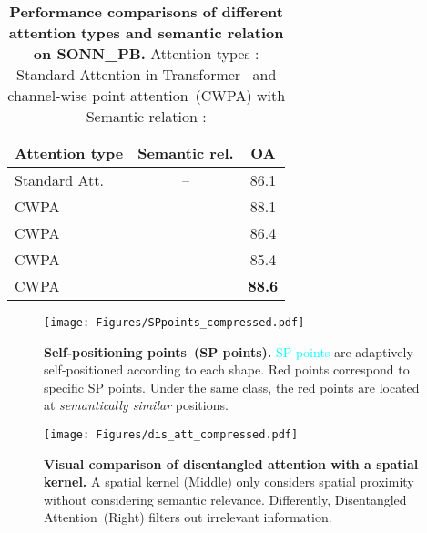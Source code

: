 \documentclass[10pt,twocolumn,letterpaper]{article}
\begin{document}
\begin{table}[t]
  \centering
\setlength{\tabcolsep}{5pt}
\begin{tabular}{l|c|c}
    \toprule
    Attention type& Semantic rel.  &   OA\\
    \midrule
    Standard Att.  &-- & 86.1\\
    CWPA &    & 88.1\\
    CWPA &     & 86.4\\
    CWPA & &  85.4\\
    CWPA & & \textbf{88.6}\\
    \bottomrule
  \end{tabular}
  
    \caption{\textbf{Performance comparisons of different attention types and semantic relation  on SONN\_PB.} Attention types : Standard Attention in Transformer~\cite{vaswani2017attention} and channel-wise point attention~(CWPA) with Semantic relation : } \label{table6}
\end{table} 
 \begin{figure*}[ht] 
\centering
\texttt{[image: Figures/SPpoints\_compressed.pdf]}
\caption{{\textbf{Self-positioning points~(SP points).} \textcolor{cyan}{SP points} are adaptively self-positioned according to each shape. \textcolor[rgb]{1,0,0}{Red points} correspond to specific SP points. Under the same class, the red points are located at \textit{semantically similar} positions.
}}
\label{fig:SPpoints}
\end{figure*} \begin{figure}[t] 
\centering

\texttt{[image: Figures/dis\_att\_compressed.pdf]}
\caption{
\textbf{Visual comparison of disentangled attention with a spatial kernel.}
{
A spatial kernel (Middle) only considers spatial proximity without considering semantic relevance. Differently, Disentangled Attention~(Right) filters out irrelevant information.}}


\label{fig:dis_att}
\end{figure}

 
\end{document}

